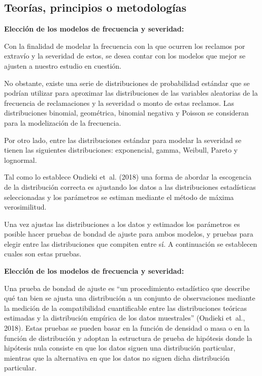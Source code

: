 \documentclass[
  letterpaper,
  onepage,
  openany]{scrreprt}
\begin{document}
\hypertarget{teoruxedas-principios-o-metodologuxedas}{%
\subsection{Teorías, principios o
metodologías}\label{teoruxedas-principios-o-metodologuxedas}}

\textbf{Elección de los modelos de frecuencia y severidad:}

Con la finalidad de modelar la frecuencia con la que ocurren los
reclamos por extravío y la severidad de estos, se desea contar con los
modelos que mejor se ajusten a nuestro estudio en cuestión.

No obstante, existe una serie de distribuciones de probabilidad estándar
que se podrían utilizar para aproximar las distribuciones de las
variables aleatorias de la frecuencia de reclamaciones y la severidad o
monto de estas reclamos. Las distribuciones binomial, geométrica,
binomial negativa y Poisson se consideran para la modelización de la
frecuencia.

Por otro lado, entre las distribuciones estándar para modelar la
severidad se tienen las siguientes distribuciones: exponencial, gamma,
Weibull, Pareto y lognormal.

Tal como lo establece Ondieki et~al. (2018) una forma de abordar la
escogencia de la distribución correcta es ajustando los datos a las
distribuciones estadísticas seleccionadas y los parámetros se estiman
mediante el método de máxima verosimilitud.

Una vez ajustas las distribuciones a los datos y estimados los
parámetros es posible hacer pruebas de bondad de ajuste para ambos
modelos, y pruebas para elegir entre las distribuciones que compiten
entre sí. A continuación se establecen cuales son estas pruebas.

\textbf{Elección de los modelos de frecuencia y severidad:}

Una prueba de bondad de ajuste es ``un procedimiento estadístico que
describe qué tan bien se ajusta una distribución a un conjunto de
observaciones mediante la medición de la compatibilidad cuantificable
entre las distribuciones teóricas estimadas y la distribución empírica
de los datos muestrales'' (Ondieki et~al., 2018). Estas pruebas se
pueden basar en la función de densidad o masa o en la función de
distribución y adoptan la estructura de prueba de hipótesis donde la
hipótesis nula consiste en que los datos siguen una distribución
particular, mientras que la alternativa en que los datos no siguen dicha
distribución particular.
\end{document}
